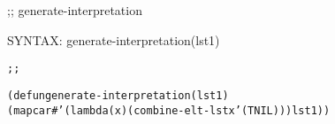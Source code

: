 \begin{aibox}{\function}
;; generate-interpretation

SYNTAX: generate-interpretation(lst1)
\end{aibox}

\begin{aibox}{\examples}
\begin{alltt}
\end{alltt}

\end{aibox}

\begin{aibox}{\comments}

\end{aibox}
\begin{aibox}{\answers}

\end{aibox}
\begin{aibox}{\othercomments}

\end{aibox}
\begin{aibox}{\pseudocode}

\end{aibox}
\begin{aibox}{\code}

\begin{alltt}
;;%% code

(defun generate-interpretation(lst1)
            (mapcar #'(lambda (x) (combine-elt-lst x '(T NIL))) lst1))

\end{alltt}
\end{aibox}

